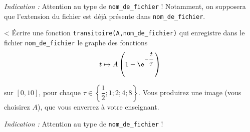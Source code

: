 \emph{Indication :} Attention au type de \texttt{nom\_de\_fichier} ! Notamment, on supposera que l'extension du fichier est déjà présente dans \texttt{nom\_de\_fichier}.

\medskip{}

\question <{}%
 \'Ecrire une fonction \texttt{transitoire(A,nom\_de\_fichier)} qui enregistre dans le fichier \texttt{nom\_de\_fichier} le graphe des fonctions 
\begin{equation*}
  t\mapsto A\left({1-\e^{-\dfrac{t}{\tau}}}\right)
\end{equation*}


sur $[0,10]$, pour chaque $\tau\in\left\{\dfrac{1}{2};1;2;4;8\right\}$. 
Vous produirez une image (vous choisirez $A$), que vous enverrez à votre enseignant. 

\emph{Indication :} Attention au type de \texttt{nom\_de\_fichier} !
